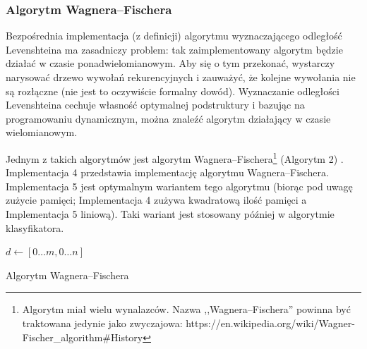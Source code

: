 \subsubsection{Algorytm Wagnera--Fischera}
Bezpośrednia implementacja (z definicji) algorytmu wyznaczającego odległość
Levenshteina ma zasadniczy problem: tak zaimplementowany algorytm będzie działać
w czasie ponadwielomianowym. Aby się o tym przekonać, wystarczy narysować drzewo
wywołań rekurencyjnych i zauważyć, że kolejne wywołania nie są rozłączne (nie
jest to oczywiście formalny dowód). Wyznaczanie odległości Levenshteina cechuje
własność optymalnej podstruktury i bazując na programowaniu dynamicznym, można
znaleźć algorytm działający w czasie wielomianowym.

Jednym z takich algorytmów jest algorytm Wagnera--Fischera\footnote{Algorytm
	miał wielu wynalazców. Nazwa ,,Wagnera--Fischera'' powinna być traktowana
	jedynie jako zwyczajowa:
	https://en.wikipedia.org/wiki/Wagner-Fischer\_algorithm\#History} (Algorytm 2)
\cite{wagner1974string}. Implementacja 4 przedstawia implementację algorytmu
Wagnera--Fischera. Implementacja 5 jest optymalnym wariantem tego algorytmu
(biorąc pod uwagę zużycie pamięci; Implementacja 4 zużywa kwadratową ilość
pamięci a Implementacja 5 liniową). Taki wariant jest stosowany później w
algorytmie klasyfikatora.

\begin{algorithm}
	\SetAlgoVlined
	\BlankLine
	\BlankLine
	$d \leftarrow [0 \dots m, 0 \dots n]$
	\BlankLine
	\caption{Algorytm Wagnera--Fischera}
\end{algorithm}




